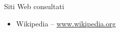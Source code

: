 \cleardoublepage
{}
{}
\nocite{*}


%

\vspace{2.5cm}
\begin{Large}Siti Web consultati\end{Large}
\begin{itemize}
\item Wikipedia -- \url{www.wikipedia.org}
\end{itemize}

